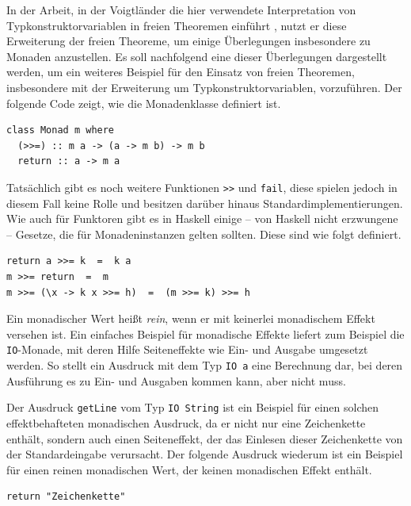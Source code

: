 
In der Arbeit, in der Voigtländer die hier verwendete Interpretation von Typkonstruktorvariablen in freien Theoremen
einführt \cite{voigtlander}, nutzt er diese Erweiterung der freien Theoreme, um einige Überlegungen insbesondere zu Monaden
anzustellen. Es soll nachfolgend eine dieser Überlegungen dargestellt werden, um ein weiteres Beispiel für den Einsatz von
freien Theoremen, insbesondere mit der Erweiterung um Typkonstruktorvariablen, vorzuführen.
Der folgende Code zeigt, wie die Monadenklasse definiert ist.

\begin{verbatim}
class Monad m where
  (>>=) :: m a -> (a -> m b) -> m b
  return :: a -> m a
\end{verbatim}

Tatsächlich gibt es noch weitere Funktionen \texttt{>>} und \texttt{fail}, diese spielen jedoch in diesem Fall keine Rolle und besitzen
darüber hinaus Standardimplementierungen. Wie auch für Funktoren gibt es in Haskell einige -- von Haskell nicht erzwungene -- Gesetze,
die für Monadeninstanzen gelten sollten. Diese sind wie folgt definiert.

\begin{verbatim}
return a >>= k  =  k a
m >>= return  =  m
m >>= (\x -> k x >>= h)  =  (m >>= k) >>= h
\end{verbatim}


Ein monadischer Wert heißt \textit{rein}, wenn er mit keinerlei monadischem Effekt versehen ist. Ein einfaches Beispiel für monadische
Effekte liefert zum Beispiel die \texttt{IO}-Monade, mit deren Hilfe Seiteneffekte wie Ein- und Ausgabe umgesetzt werden. So
stellt ein Ausdruck mit dem Typ \texttt{IO\ a} eine Berechnung dar, bei deren Ausführung es zu Ein- und Ausgaben kommen kann, aber
nicht muss.

Der Ausdruck \texttt{getLine} vom Typ \texttt{IO String} ist ein Beispiel für einen solchen effektbehafteten monadischen Ausdruck, da
er nicht nur eine Zeichenkette enthält, sondern auch einen Seiteneffekt, der das Einlesen dieser Zeichenkette von der
Standardeingabe verursacht.
Der folgende Ausdruck wiederum ist ein Beispiel für einen reinen monadischen Wert, der keinen monadischen
Effekt enthält.

\begin{verbatim}
return "Zeichenkette"
\end{verbatim}

